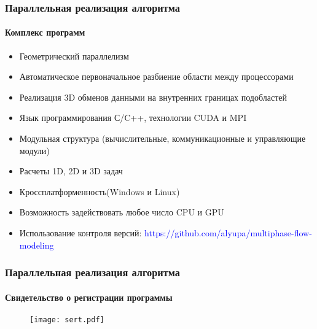 \begin{frame}
\begin{center}
\frametitle{Параллельная реализация алгоритма}
\framesubtitle{Комплекс программ}
\begin{itemize}
\item Геометрический параллелизм
\item Автоматическое первоначальное разбиение области между процессорами
\item Реализация 3D обменов данными на внутренних границах подобластей
\item Язык программирования С/C++, технологии CUDA и MPI
\item Модульная структура (вычислительные, коммуникационные и управляющие модули)
\item Расчеты 1D, 2D и 3D задач
\item Кроссплатформенность(Windows и Linux)
\item Возможность задействовать любое число CPU и GPU
\item Использование контроля версий: \textcolor{blue}{https://github.com/alyupa/multiphase-flow-modeling}
\end{itemize}
\end{center}
\end{frame}

\begin{frame}
\begin{center}
\frametitle{Параллельная реализация алгоритма}
\framesubtitle{Свидетельство о регистрации программы}
\begin{figure}
\vspace{-2mm}
\texttt{[image: sert.pdf]}
\end{figure}
\end{center}
\end{frame}